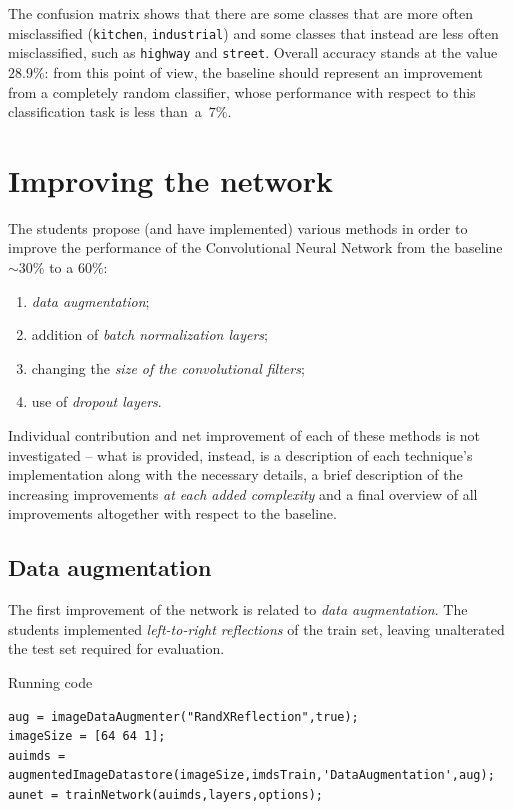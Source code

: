 \documentclass[a4paper, 11pt]{article} %
\begin{document}
The confusion matrix shows that there are some classes that are more often misclassified (\texttt{kitchen}, \texttt{industrial}) and some classes that instead are less often misclassified, such as \texttt{highway} and \texttt{street}. Overall accuracy stands at the value $28.9\%$: from this point of view, the baseline should represent an improvement from a completely random classifier, whose performance with respect to this classification task is less than~a~$7\%$.

\clearpage

\section{Improving the network}

The students propose (and have implemented) various methods in order to improve the performance of the Convolutional Neural Network from the baseline $\sim 30\%$ to a $60\%$:

\begin{enumerate}
    \item \emph{data augmentation};
    \item addition of \emph{batch normalization layers};
    \item changing the \emph{size of the convolutional filters};
    \item use of \emph{dropout layers}.
\end{enumerate}

Individual contribution and net improvement of each of these methods is not investigated \--- what is provided, instead, is a description of each technique's implementation along with the necessary details, a brief description of the increasing improvements \emph{at each added complexity} and a final overview of all improvements altogether with respect to the baseline. 

\subsection{Data augmentation}

The first improvement of the network is related to \emph{data augmentation}. The students implemented \emph{left-to-right reflections} of the train set, leaving unalterated the test set required for evaluation.

Running code 

\begin{lstlisting}
aug = imageDataAugmenter("RandXReflection",true);
imageSize = [64 64 1];
auimds = augmentedImageDatastore(imageSize,imdsTrain,'DataAugmentation',aug);
aunet = trainNetwork(auimds,layers,options);
\end{lstlisting}
\end{document}
